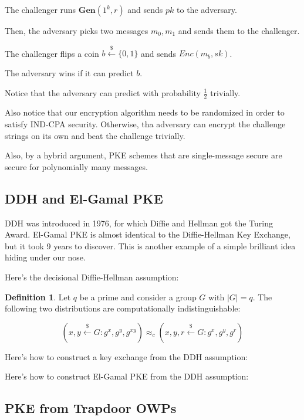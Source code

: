 \documentclass{article}
\theoremstyle{definition}
\newtheorem{definition}{Definition}
\newcommand{\Gen}{\textbf{Gen}}
\begin{document}
The challenger runs $\Gen(1^{k}, r)$ and sends $pk$ to the adversary.

Then, the adversary picks two messages $m_{0},m_{1}$ and sends them to the challenger.

The challenger flips a coin $b \xleftarrow{\$} \{0,1\}$ and sends $Enc(m_{b}, sk)$.

The adversary wins if it can predict $b$.

Notice that the adversary can predict with probability $\frac{1}{2}$ trivially.

Also notice that our encryption algorithm needs to be randomized in order to satisfy IND-CPA security.
Otherwise, tha adversary can encrypt the challenge strings on its own and beat the challenge trivially.

Also, by a hybrid argument, PKE schemes that are single-message secure are secure for polynomially
many messages.

\newpage

\subsection{DDH and El-Gamal PKE}

DDH was introduced in 1976, for which Diffie and Hellman got the Turing Award.
El-Gamal PKE is almost identical to the Diffie-Hellman Key Exchange, but it took
9 years to discover. This is another example of a simple brilliant idea hiding under our nose.

Here's the decisional Diffie-Hellman assumption:

\begin{definition}
    Let $q$ be a prime and consider a group $G$ with $\lvert G \rvert = q$.
    The following two distributions are computationally indistinguishable:

    \[ (x,y \xleftarrow{\$} G: g^{x},g^{y}, g^{xy}) \approx_{c}(x,y,r \xleftarrow{\$} G: g^{x},g^{y}, g^{r})\]
\end{definition}

Here's how to construct a key exchange from the DDH assumption:


Here's how to construct El-Gamal PKE from the DDH assumption:



\newpage

\subsection{PKE from Trapdoor OWPs}
\end{document}
